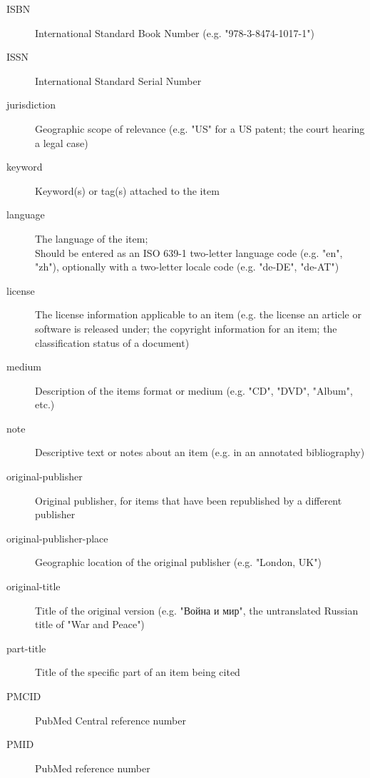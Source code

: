 \begin{description}
  \item[ISBN]
    International Standard Book Number (e.g. "978-3-8474-1017-1")

  \item[ISSN]
    International Standard Serial Number

  \item[jurisdiction]
    Geographic scope of relevance (e.g. "US" for a US patent; the court
    hearing a legal case)

  \item[keyword]
    Keyword(s) or tag(s) attached to the item

  \item[language]
    The language of the item;\\
    Should be entered as an ISO 639-1 two-letter language code (e.g. "en",
    "zh"), optionally with a two-letter locale code (e.g. "de-DE", "de-AT")

  \item[license]
    The license information applicable to an item (e.g. the license an
    article or software is released under; the copyright information for an
    item; the classification status of a document)

  \item[medium]
    Description of the item\textquotesingle s format or medium (e.g. "CD",
    "DVD", "Album", etc.)

  \item[note]
    Descriptive text or notes about an item (e.g. in an annotated
    bibliography)

  \item[original-publisher]
    Original publisher, for items that have been republished by a different
    publisher

  \item[original-publisher-place]
    Geographic location of the original publisher (e.g. "London, UK")

  \item[original-title]
    Title of the original version (e.g. "Война и мир", the untranslated
    Russian title of "War and Peace")

  \item[part-title]
    Title of the specific part of an item being cited

  \item[PMCID]
    PubMed Central reference number

  \item[PMID]
    PubMed reference number


\end{description}
